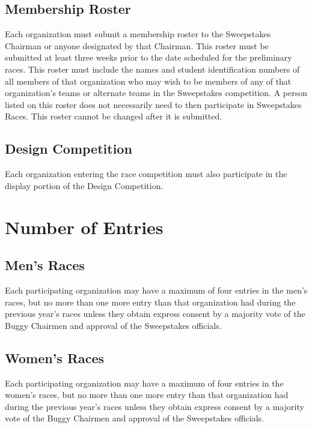 \subsection{Membership Roster}

	Each organization must submit a membership roster to the Sweepstakes Chairman
	or anyone designated by that Chairman. This roster must be submitted at least
	three weeks prior to the date scheduled for the preliminary races. This roster
	must include the names and student identification numbers of all members of
	that organization who may wish to be members of any of that organization's
	teams or alternate teams in the Sweepstakes competition. A person listed on
	this roster does not necessarily need to then participate in Sweepstakes Races.
	This roster cannot be changed after it is submitted.

\subsection{Design Competition}
	
	Each organization entering the race competition must also participate in the
	display portion of the Design Competition.

\section{Number of Entries}

\subsection{Men's Races}

	Each participating organization may have a maximum of four entries in the men's
	races, but no more than one more entry than that organization had during the
	previous year's races unless they obtain express consent by a majority vote of
	the Buggy Chairmen and approval of the Sweepstakes officials.

\subsection{Women's Races}

	Each participating organization may have a maximum of four entries in the
	women's races, but no more than one more entry than that organization had
	during the previous year's races unless they obtain express consent by a
	majority vote of the Buggy Chairmen and approval of the Sweepstakes officials.


